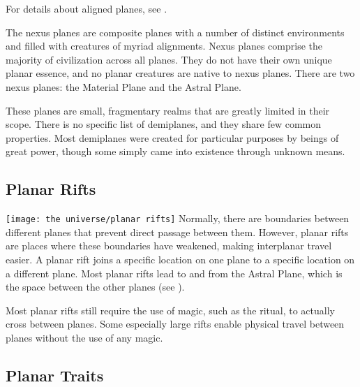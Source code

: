         For details about aligned planes, see .

         The nexus planes are composite planes with a number of distinct environments and filled with creatures of myriad alignments.
        Nexus planes comprise the majority of civilization across all planes.
        They do not have their own unique planar essence, and no planar creatures are native to nexus planes.
        There are two nexus planes: the Material Plane and the Astral Plane.

         These planes are small, fragmentary realms that are greatly limited in their scope.
        There is no specific list of demiplanes, and they share few common properties.
        Most demiplanes were created for particular purposes by beings of great power, though some simply came into existence through unknown means.

    \subsection{Planar Rifts}\label{Planar Rifts}
        \texttt{[image: the universe/planar rifts]}
        Normally, there are boundaries between different planes that prevent direct passage between them.
        However, planar rifts are places where these boundaries have weakened, making interplanar travel easier.
        A planar rift joins a specific location on one plane to a specific location on a different plane.
        Most planar rifts lead to and from the Astral Plane, which is the space between the other planes (see ).

        Most planar rifts still require the use of magic, such as the  ritual, to actually cross between planes.
        Some especially large rifts enable physical travel between planes without the use of any magic.

    \subsection{Planar Traits}
